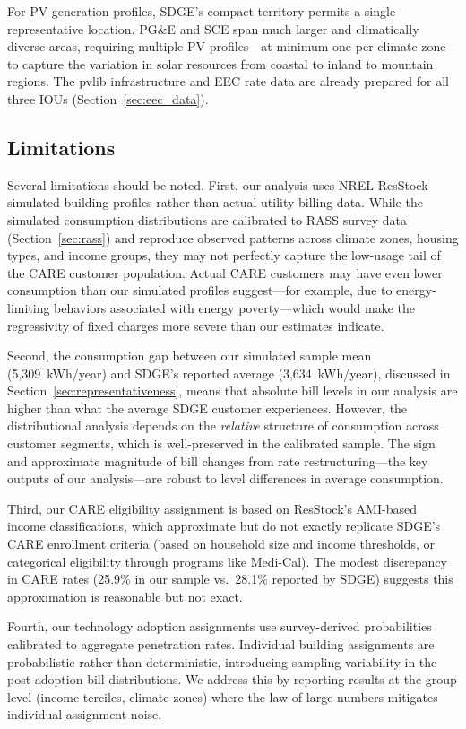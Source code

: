 \documentclass[12pt]{article}
\begin{document}
For PV generation profiles, SDGE's compact territory permits a single representative location. PG\&E and SCE span much larger and climatically diverse areas, requiring multiple PV profiles---at minimum one per climate zone---to capture the variation in solar resources from coastal to inland to mountain regions. The pvlib infrastructure and EEC rate data are already prepared for all three IOUs (Section~\ref{sec:eec_data}).

\subsection{Limitations}
\label{sec:limitations}

Several limitations should be noted. First, our analysis uses NREL ResStock simulated building profiles rather than actual utility billing data. While the simulated consumption distributions are calibrated to RASS survey data (Section~\ref{sec:rass}) and reproduce observed patterns across climate zones, housing types, and income groups, they may not perfectly capture the low-usage tail of the CARE customer population. Actual CARE customers may have even lower consumption than our simulated profiles suggest---for example, due to energy-limiting behaviors associated with energy poverty---which would make the regressivity of fixed charges more severe than our estimates indicate.

Second, the consumption gap between our simulated sample mean (5,309~kWh/year) and SDGE's reported average (3,634~kWh/year), discussed in Section~\ref{sec:representativeness}, means that absolute bill levels in our analysis are higher than what the average SDGE customer experiences. However, the distributional analysis depends on the \textit{relative} structure of consumption across customer segments, which is well-preserved in the calibrated sample. The sign and approximate magnitude of bill changes from rate restructuring---the key outputs of our analysis---are robust to level differences in average consumption.

Third, our CARE eligibility assignment is based on ResStock's AMI-based income classifications, which approximate but do not exactly replicate SDGE's CARE enrollment criteria (based on household size and income thresholds, or categorical eligibility through programs like Medi-Cal). The modest discrepancy in CARE rates (25.9\% in our sample vs.\ 28.1\% reported by SDGE) suggests this approximation is reasonable but not exact.

Fourth, our technology adoption assignments use survey-derived probabilities calibrated to aggregate penetration rates. Individual building assignments are probabilistic rather than deterministic, introducing sampling variability in the post-adoption bill distributions. We address this by reporting results at the group level (income terciles, climate zones) where the law of large numbers mitigates individual assignment noise.
\end{document}
